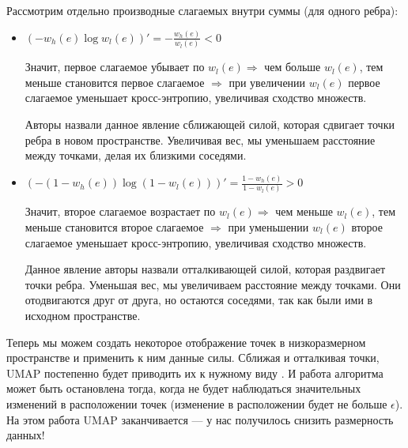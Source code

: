 Рассмотрим отдельно производные слагаемых внутри суммы (для одного ребра):
\begin{itemize}
	\item $\displaystyle (-w_h(e)\log w_l(e))' = - \frac{w_h(e)}{w_l(e)} < 0$
	
	Значит, первое слагаемое убывает по $w_l(e) \Rightarrow$ чем больше $w_l(e)$, тем меньше становится первое слагаемое $\Rightarrow$ при увеличении $w_l(e)$ первое слагаемое уменьшает кросс-энтропию, увеличивая сходство множеств.
	
	Авторы назвали данное явление сближающей силой, которая сдвигает точки ребра в новом пространстве. Увеличивая вес, мы уменьшаем расстояние между точками, делая их близкими соседями.
	
	\item $\displaystyle (-(1 - w_h(e))\log (1 - w_l(e)))' = \frac{1 - w_h(e)}{1 - w_l(e)} > 0$
	
	Значит, второе слагаемое возрастает по $w_l(e) \Rightarrow$ чем меньше $w_l(e)$, тем меньше становится второе слагаемое $\Rightarrow$ при уменьшении $w_l(e)$ второе слагаемое уменьшает кросс-энтропию, увеличивая сходство множеств.
	
	Данное явление авторы назвали отталкивающей силой, которая раздвигает точки ребра. Уменьшая вес, мы увеличиваем расстояние между точками. Они отодвигаются друг от друга, но остаются соседями, так как были ими в исходном пространстве.	
\end{itemize}

Теперь мы можем создать некоторое отображение точек в низкоразмерном пространстве и применить к ним данные силы. Сближая и отталкивая точки, UMAP постепенно будет приводить их к нужному виду \cite{umap}. И работа алгоритма может быть остановлена тогда, когда не будет наблюдаться значительных изменений в расположении точек (изменение в расположении будет не больше $\epsilon$). На этом работа UMAP заканчивается --- у нас получилось снизить размерность данных!